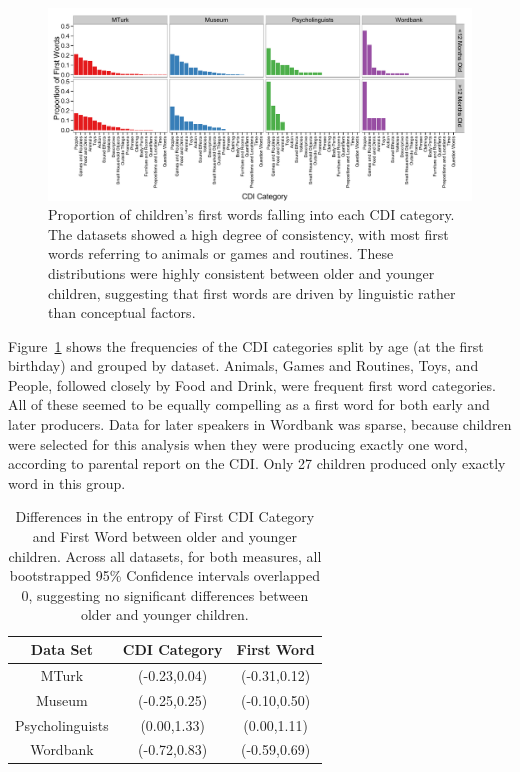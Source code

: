 \documentclass[10pt,letterpaper]{article}
\begin{document}
\begin{figure}[tb]
\begin{center}
\includegraphics[width = .9\textwidth]{figures/cdicats_4sets.pdf}
\end{center}
\caption{Proportion of children's first words falling into each CDI category. The datasets showed a high degree of consistency, with most first words referring to animals or games and routines. These distributions were highly consistent between older and younger children, suggesting that first words are driven by linguistic rather than conceptual factors.}
\label{fig:cdi_cats}
\vspace{-1em}
\end{figure}

Figure~\ref{fig:cdi_cats} shows the frequencies of the CDI categories split by age (at the first birthday) and grouped by dataset. Animals, Games and Routines, Toys, and People, followed closely by Food and Drink, were frequent first word categories. All of these seemed to be equally compelling as a first word for both early and later producers. Data for later speakers in Wordbank was sparse, because children were selected for this analysis when they were producing exactly one word, according to parental report on the CDI. Only 27 children produced only exactly word in this group.

\begin{table}[tb]
\centering
\begin{tabular}{ccc}
\hline
Data Set & CDI Category & First Word \\ 
  \hline
  MTurk & (-0.23,0.04) & (-0.31,0.12) \\ 
  Museum & (-0.25,0.25) & (-0.10,0.50) \\ 
  Psycholinguists & (0.00,1.33) & (0.00,1.11) \\ 
  Wordbank & (-0.72,0.83) & (-0.59,0.69) \\ 
   \hline
\end{tabular}
\label{tab:ent_diffs}
\caption{Differences in the entropy of First CDI Category and First Word between older and younger children. Across all datasets, for both measures, all bootstrapped 95\% Confidence intervals overlapped 0, suggesting no significant differences between older and younger children.}
\end{table}
\end{document}
